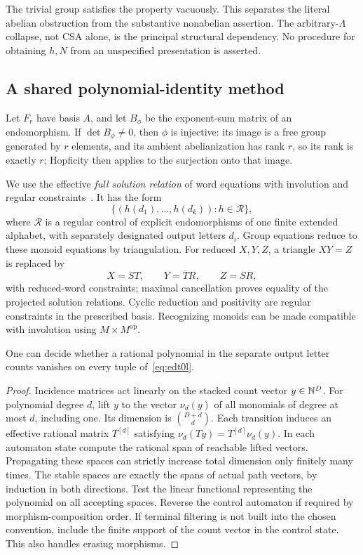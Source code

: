 The trivial group satisfies the property vacuously. This separates the
literal abelian obstruction from the substantive nonabelian assertion.
The arbitrary-$\Lambda$ collapse, not CSA alone, is the principal
structural dependency. No procedure for obtaining $h,N$ from an
unspecified presentation is asserted.

\subsection{A shared polynomial-identity method}\label{sec:languages}
Let $F_r$ have basis $A$, and let $B_\phi$ be the exponent-sum matrix
of an endomorphism. If $\det B_\phi\ne0$, then $\phi$ is injective:
its image is a free group generated by $r$ elements, and its ambient
abelianization has rank $r$, so its rank is exactly $r$; Hopficity then
applies to the surjection onto that image.

We use the effective \emph{full solution relation} of word equations
with involution and regular constraints~\cite[Theorem 4.3]{diekert-elder}.
It has the form
\begin{equation}\label{eq:edt0l}
 \{(h(d_1),\ldots,h(d_k)):h\in\mathcal R\},
\end{equation}
where $\mathcal R$ is a regular control of explicit endomorphisms of
one finite extended alphabet, with separately designated output letters
$d_i$. Group equations reduce to these monoid equations by triangulation.
For reduced $X,Y,Z$, a triangle $XY=Z$ is replaced by
\[
 X=ST,\qquad Y=\overline T R,\qquad Z=SR,
\]
with reduced-word constraints; maximal cancellation proves equality of
the projected solution relations. Cyclic reduction and positivity are
regular constraints in the prescribed basis. Recognizing monoids can
be made compatible with involution using $M\times M^{\mathrm{op}}$.

\begin{lemma}\label{lem:polynomial}
One can decide whether a rational polynomial in the separate output
letter counts vanishes on every tuple of~\eqref{eq:edt0l}.
\end{lemma}
\begin{proof}
Incidence matrices act linearly on the stacked count vector $y\in\mathbb N^D$.
For polynomial degree $d$, lift $y$ to the vector $\nu_d(y)$ of all
monomials of degree at most $d$, including one. Its dimension is
$\binom{D+d}{d}$. Each transition induces an effective rational matrix
$T^{[d]}$ satisfying $\nu_d(Ty)=T^{[d]}\nu_d(y)$.
In each automaton state compute the rational span of reachable lifted
vectors. Propagating these spaces can strictly increase total dimension
only finitely many times. The stable spaces are exactly the spans of
actual path vectors, by induction in both directions. Test the linear
functional representing the polynomial on all accepting spaces.
Reverse the control automaton if required by morphism-composition order.
If terminal filtering is not built into the chosen convention, include
the finite support of the count vector in the control state. This also
handles erasing morphisms.
\end{proof}

